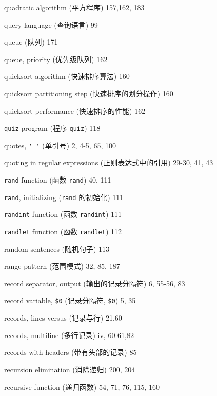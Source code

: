 \begin{multicols}{2}
\hangindent=2pc  quadratic algorithm (平方程序) 157,162, 183

\hangindent=2pc  query language (查询语言) 99

\hangindent=2pc  queue (队列) 171

\hangindent=2pc  queue, priority (优先级队列) 162

\hangindent=2pc  quicksort algorithm (快速排序算法) 160

\hangindent=2pc  quicksort partitioning step
(快速排序的划分操作) 160

\hangindent=2pc  quicksort performance (快速排序的性能) 162

\hangindent=2pc  \verb'quiz' program (程序 \verb'quiz') 118

\hangindent=2pc  quotes, \verb"' '" (单引号) 2, 4-5, 65, 100

\hangindent=2pc  quoting in regular expressions
(正则表达式中的引用) 29-30, 41, 43

\hangindent=2pc  \verb'rand' function (函数 \verb'rand') 40, 111

\hangindent=2pc  \verb'rand', initializing (\verb'rand'
的初始化) 111

\hangindent=2pc  \verb'randint' function (函数 \verb'randint') 111

\hangindent=2pc  \verb'randlet' function (函数 \verb'randlet') 112

\hangindent=2pc  random sentences (随机句子) 113

\hangindent=2pc  range pattern (范围模式) 32, 85, 187

\hangindent=2pc  record separator, output (输出的记录分隔符)
6, 55-56, 83

\hangindent=2pc  record variable, \verb'$0' (记录分隔符,
\verb'$0') 5, 35

\hangindent=2pc  records, lines versus (记录与行) 21,60

\hangindent=2pc  records, multiline (多行记录) iv, 60-61,82

\hangindent=2pc  records with headers (带有头部的记录) 85

\hangindent=2pc  recursion elimination (消除递归) 200, 204

\hangindent=2pc  recursive function (递归函数) 54, 71, 76, 115, 160


\end{multicols}
